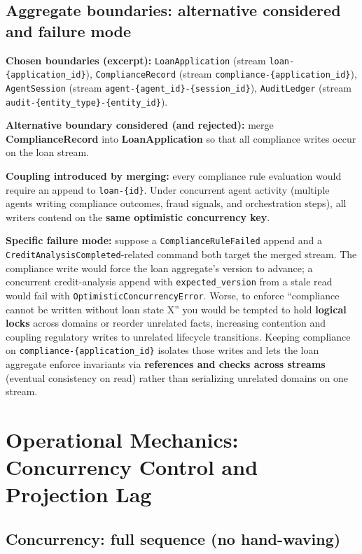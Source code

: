 \documentclass[11pt,a4paper]{article}
\begin{document}
\subsection{Aggregate boundaries: alternative considered and failure mode}

\textbf{Chosen boundaries (excerpt):} \texttt{LoanApplication} (stream \texttt{loan-\{application\_id\}}), \texttt{ComplianceRecord} (stream \texttt{compliance-\{application\_id\}}), \texttt{AgentSession} (stream \texttt{agent-\{agent\_id\}-\{session\_id\}}), \texttt{AuditLedger} (stream \texttt{audit-\{entity\_type\}-\{entity\_id\}}).

\textbf{Alternative boundary considered (and rejected):} merge \textbf{ComplianceRecord} into \textbf{LoanApplication} so that all compliance writes occur on the loan stream.

\textbf{Coupling introduced by merging:} every compliance rule evaluation would require an append to \texttt{loan-\{id\}}. Under concurrent agent activity (multiple agents writing compliance outcomes, fraud signals, and orchestration steps), all writers contend on the \textbf{same optimistic concurrency key}.

\textbf{Specific failure mode:} suppose a \texttt{ComplianceRuleFailed} append and a \texttt{CreditAnalysisCompleted}-related command both target the merged stream. The compliance write would force the loan aggregate's version to advance; a concurrent credit-analysis append with \texttt{expected\_version} from a stale read would fail with \texttt{OptimisticConcurrencyError}. Worse, to enforce ``compliance cannot be written without loan state X'' you would be tempted to hold \textbf{logical locks} across domains or reorder unrelated facts, increasing contention and coupling regulatory writes to unrelated lifecycle transitions. Keeping compliance on \texttt{compliance-\{application\_id\}} isolates those writes and lets the loan aggregate enforce invariants via \textbf{references and checks across streams} (eventual consistency on read) rather than serializing unrelated domains on one stream.

\section{Operational Mechanics: Concurrency Control and Projection Lag}

\subsection{Concurrency: full sequence (no hand-waving)}
\end{document}

